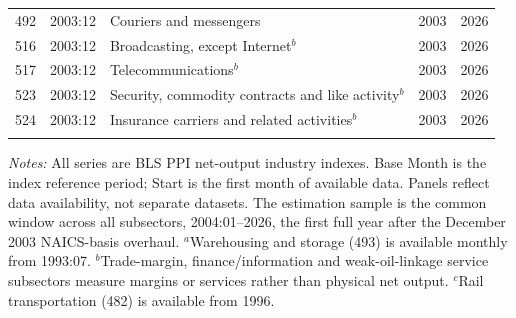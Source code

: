 {\begin{longtable}{llp{5cm}cc}
492 & 2003:12 & Couriers and messengers & 2003 & 2026 \\
516 & 2003:12 & Broadcasting, except Internet$^{b}$ & 2003 & 2026 \\
517 & 2003:12 & Telecommunications$^{b}$ & 2003 & 2026 \\
523 & 2003:12 & Security, commodity contracts and like activity$^{b}$ & 2003 & 2026 \\
524 & 2003:12 & Insurance carriers and related activities$^{b}$ & 2003 & 2026 \\
\addlinespace
\end{longtable}
\par\vspace{-0.4em}\textit{Notes:}  All series are BLS PPI net-output industry indexes. Base Month is the index reference period; Start is the first month of available data. Panels reflect data availability, not separate datasets. The estimation sample is the common window across all subsectors, 2004:01--2026, the first full year after the December 2003 NAICS-basis overhaul. $^{a}$Warehousing and storage (493) is available monthly from 1993:07. $^{b}$Trade-margin, finance/information and weak-oil-linkage service subsectors measure margins or services rather than physical net output. $^{c}$Rail transportation (482) is available from 1996. 
}
